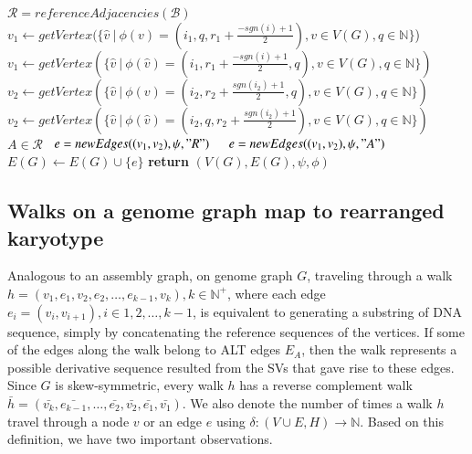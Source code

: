 \documentclass[phd,tocprelim]{cornell}
\begin{document}
\begin{algorithm}[h!]
    \begin{algorithmic}
        \State $\mathcal{R} = referenceAdjacencies(\mathcal{B})$  
        \State $v_1 \gets getVertex(\{ \hat{v} \ | \ \phi(v) = (i_1, q, r_1+\frac{-sgn(i)+1}{2}), v \in V(G), q \in \mathbb{N}\}$)
        \Else
        \State $v_1 \gets getVertex(\{ \hat{v} \ | \ \phi(\hat{v}) = (i_1, r_1 + \frac{-sgn(i)+1}{2}, q), v \in V(G), q \in \mathbb{N}\})$
        \EndIf
        \State $v_2 \gets getVertex(\{ \hat{v} \ | \ \phi(v) = (i_2, r_2 + \frac{sgn(i_2)+1}{2}, q), v \in V(G), q \in \mathbb{N}\})$
        \Else
        \State $v_2 \gets getVertex(\{ \hat{v} \ | \ \phi(\hat{v}) = (i_2, q, r_2 + \frac{sgn(i_2)+1}{2}), v \in V(G), q \in \mathbb{N} \})$
        \EndIf
        \State \algorithmicif\ $A \in \mathcal{R}$ \algorithmicthen\ $e = newEdges((v_1, v_2), \psi, "R")$ \ \algorithmicelse \ $e = newEdges((v_1, v_2), \psi, "A")$
        \State $E(G) \gets E(G) \cup \{e\}$
        \EndFor
        \State \textbf{return} $(V(G), E(G), \psi, \phi)$
        \EndProcedure
    \end{algorithmic}
\end{algorithm}

\newpage

\subsection{Walks on a genome graph map to rearranged karyotype}
Analogous to an assembly graph, on genome graph $G$, traveling through a walk $h = (v_1, e_1, v_2, e_2, \dots, e_{k-1}, v_k), k \in \mathbb{N^+}$, where each edge $e_i = (v_i, v_{i+1}), i \in 1, 2, \dots, k-1$, is equivalent to generating a substring of DNA sequence, simply by concatenating the reference sequences of the vertices. If some of the edges along the walk belong to ALT edges $E_{A}$, then the walk represents a possible derivative sequence resulted from the SVs that gave rise to these edges. Since $G$ is skew-symmetric, every walk $h$ has a reverse complement walk $\bar{h} = (\bar{v_k}, \bar{e_{k-1}}, \dots, \bar{e_2}, \bar{v_2}, \bar{e_1}, \bar{v_1})$. We also denote the number of times a walk $h$ travel through a node $v$ or an edge $e$ using $\delta : (V \cup E, H) \rightarrow \mathbb{N}$. Based on this definition, we have two important observations.
\end{document}
